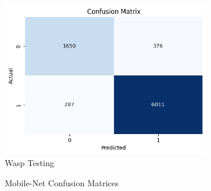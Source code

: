 \documentclass[12pt]{article}
\begin{document}
\begin{enumerate}
\begin{figure}[H]
\begin{minipage}{0.45\textwidth}
				\includegraphics[width=0.8\textwidth]{Images/Confusion/mobile wasps test.png} \\ \vspace{0.25 cm}
				Wasp Testing
			\end{minipage}
			\vspace{1 cm}
			\caption{Mobile-Net Confusion Matrices}
		\end{figure}
		\newpage
		

\end{enumerate}
\end{document}
